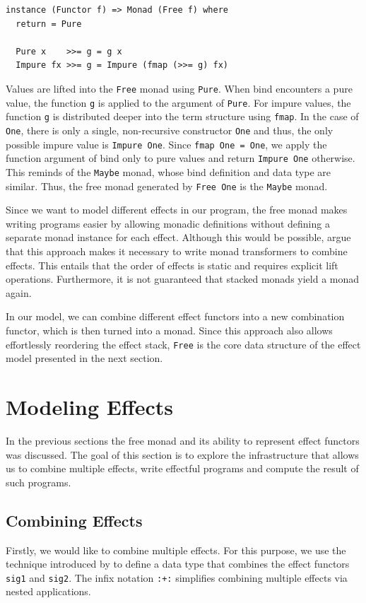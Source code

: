 \documentclass[a4paper, 11pt, fleqn, twoside, abstract=on]{scrreprt}
\newcommand{\hinl}[1]{\texttt{#1}}
\newcommand{\cinl}[1]{\texttt{#1}}
\begin{document}
\begin{verbatim}
instance (Functor f) => Monad (Free f) where
  return = Pure

  Pure x    >>= g = g x
  Impure fx >>= g = Impure (fmap (>>= g) fx)
\end{verbatim}

Values are lifted into the \cinl{Free} monad using \cinl{Pure}.
When bind encounters a pure value, the function \hinl{g} is applied to the argument of \hinl{Pure}.
For impure values, the function \hinl{g} is distributed deeper into the term structure using \hinl{fmap}.
In the case of \hinl{One}, there is only a single, non-recursive constructor \hinl{One} and thus, the only possible impure value is \hinl{Impure One}.
Since \hinl{fmap One = One}, we apply the function argument of bind only to pure values and return \cinl{Impure One} otherwise.
This reminds of the \hinl{Maybe} monad, whose bind definition and data type are similar.
Thus, the free monad generated by \hinl{Free One} is the \hinl{Maybe} monad.


Since we want to model different effects in our program, the free monad makes writing programs easier by allowing monadic definitions without defining a separate monad instance for each effect.
Although this would be possible, \citet{kammar2013handlers} argue that this approach makes it necessary to write monad transformers to combine effects.
This entails that the order of effects is static and requires explicit lift operations.
Furthermore, it is not guaranteed that stacked monads yield a monad again.

In our model, we can combine different effect functors into a new combination functor, which is then turned into a monad.
Since this approach also allows effortlessly reordering the effect stack, \hinl{Free} is the core data structure of the effect model presented in the next section.

\section{Modeling Effects}
In the previous sections the free monad and its ability to represent effect functors was discussed.
The goal of this section is to explore the infrastructure that allows us to combine multiple effects, write effectful programs and compute the result of such programs.

\subsection{Combining Effects}
Firstly, we would like to combine multiple effects.
For this purpose, we use the technique introduced by \citet{swierstra2008} to define a data type that combines the effect functors \hinl{sig1} and \hinl{sig2}.
The infix notation \hinl{:+:} simplifies combining multiple effects via nested applications.
\end{document}
